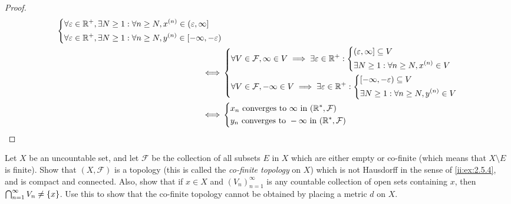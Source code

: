 \begin{proof}
\begin{align*}
\begin{dcases}
             \forall \varepsilon \in \mathbb{R}^+, \exists N \geq 1 : \forall n \geq N, x^{(n)} \in (\varepsilon, \infty] \\
             \forall \varepsilon \in \mathbb{R}^+, \exists N \geq 1 : \forall n \geq N, y^{(n)} \in [-\infty, -\varepsilon)
           \end{dcases} \\
    \iff & \begin{dcases}
             \forall V \in \mathcal{F}, \infty \in V \implies \exists \varepsilon \in \mathbb{R}^+ : \begin{dcases}
                                                                                        (\varepsilon, \infty] \subseteq V \\
                                                                                        \exists N \geq 1 : \forall n \geq N, x^{(n)} \in V
                                                                                      \end{dcases} \\
             \forall V \in \mathcal{F}, -\infty \in V \implies \exists \varepsilon \in \mathbb{R}^+ : \begin{dcases}
                                                                                         [-\infty, -\varepsilon) \subseteq V \\
                                                                                         \exists N \geq 1 : \forall n \geq N, y^{(n)} \in V
                                                                                       \end{dcases}
           \end{dcases}                   \\
    \iff & \begin{dcases}
             x_n \text{ converges to } \infty \text{ in } (\mathbb{R}^*, \mathcal{F})  \\
             y_n \text{ converges to } -\infty \text{ in } (\mathbb{R}^*, \mathcal{F}) \\
           \end{dcases}
  \end{align*}
\end{proof}

\begin{ex}\label{ii:ex:2.5.6}
  Let \(X\) be an uncountable set, and let \(\mathcal{F}\) be the collection of all subsets \(E\) in \(X\) which are either empty or co-finite (which means that \(X \setminus E\) is finite).
  Show that \((X, \mathcal{F})\) is a topology (this is called the \emph{co-finite topology} on \(X\)) which is not Hausdorff in the sense of \cref{ii:ex:2.5.4}, and is compact and connected.
  Also, show that if \(x \in X\) and \((V_n)_{n = 1}^\infty\) is any countable collection of open sets containing \(x\), then \(\bigcap_{n = 1}^\infty V_n \neq \left\lbrace x\right\rbrace\).
  Use this to show that the co-finite topology cannot be obtained by placing a metric \(d\) on \(X\).
\end{ex}

